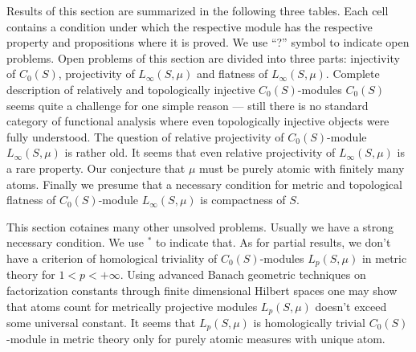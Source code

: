 Results of this section are summarized in the following three tables. Each cell
contains a condition under which the respective module has the respective
property and propositions where it is proved. We use ``?'' symbol to indicate 
open problems. Open problems of this section are divided into three parts:
injectivity of $C_0(S)$, projectivity of $L_\infty(S,\mu)$ and flatness of
$L_\infty(S,\mu)$. Complete description of relatively and topologically
injective $C_0(S)$-modules $C_0(S)$ seems quite a challenge for one simple
reason --- still there is no standard category of functional analysis where even
topologically injective objects were fully understood. The question of relative
projectivity of $C_0(S)$-module $L_\infty(S,\mu)$ is rather old. It seems that
even relative projectivity of $L_\infty(S,\mu)$ is a rare property. Our
conjecture that $\mu$ must be purely atomic with finitely many atoms. Finally we
presume that a necessary condition for metric and topological flatness of
$C_0(S)$-module $L_\infty(S,\mu)$ is compactness of $S$.

This section cotaines many other unsolved problems. Usually we have a strong
necessary condition. We use ${}^{*}$ to indicate that. As for partial results, 
we don't have a criterion of homological triviality of $C_0(S)$-modules 
$L_p(S,\mu)$ in metric theory for $1<p<+\infty$. Using advanced
Banach geometric techniques on factorization constants through finite
dimensional Hilbert spaces one may show that atoms count for metrically
projective modules $L_p(S,\mu)$ doesn't exceed some universal constant. It seems
that $L_p(S,\mu)$ is homologically trivial $C_0(S)$-module in metric theory only
for purely atomic measures with unique atom. 

